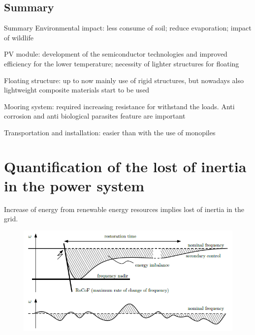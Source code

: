 \documentclass[aspectratio=169, 12pt]{beamer}
\begin{document}
\subsection{Summary}
\begin{frame}{Summary}
  \textcolor{NTNUBlue}{Environmental impact}: less consume of soil; reduce evaporation; impact of wildlife

  \textcolor{NTNUBlue}{PV module}: development of the semiconductor technologies and improved efficiency for the lower temperature; necessity of lighter structures for floating
  
  \textcolor{NTNUBlue}{Floating structure}: up to now mainly use of rigid structures, but nowadays also lightweight composite materials start to be used

  \textcolor{NTNUBlue}{Mooring system}: required increasing resistance for withstand the loads. Anti corrosion and anti biological parasites feature are important

  \textcolor{NTNUBlue}{Transportation and installation}: easier than with the use of monopiles

\end{frame}

                                  

\section{Quantification of the lost of inertia in the power system}
\begin{frame}{\insertsection}
  Increase of energy from renewable energy resources implies lost of inertia in the grid.
  \begin{figure}
    \centering
    \includegraphics[width=0.5\columnwidth]{figure/frequency_disturbance.png}
  \end{figure} 
\end{frame}
\end{document}
